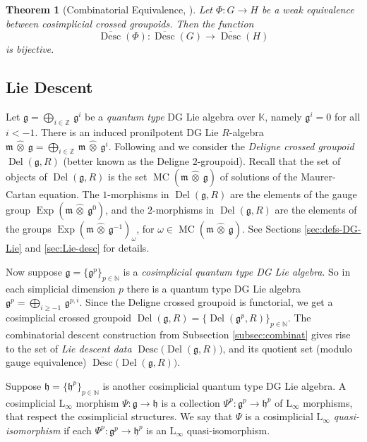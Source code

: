 \documentclass[a4paper, 10pt]{amsart}
\newtheorem{thm}[equation]{Theorem}
\theoremstyle{definition}
\numberwithin{equation}{section}
\newcommand{\opn}{\operatorname}
\newcommand{\ol}{\overline}
\newcommand{\mfrak}[1]{\mathfrak{#1}}
\newcommand{\mrm}[1]{\mathrm{#1}}
\newcommand{\mbb}[1]{\mathbb{#1}}
\newcommand{\hatotimes}[1]{\, \what{{\otimes}}_{#1} \,}
\newcommand{\hot}{\hatotimes{}}
\newcommand{\what}[1]{\widehat{#1}}
\newcommand{\K}{\mbb{K}}
\newcommand{\N}{\mbb{N}}
\newcommand{\Z}{\mbb{Z}}
\newcommand{\g}{\mfrak{g}}
\newcommand{\m}{\mfrak{m}}
\newcommand{\h}{\mfrak{h}}
\newcommand{\om}{\omega}
\newcommand{\lb}{\linebreak}
\begin{document}
\begin{thm}[{Combinatorial Equivalence,  \cite[Theorem 0.1]{Ye8}}]
\label{thm:intro.100}
Let $\Phi : G \to H$ be a weak equivalence between 
cosimplicial crossed groupoids. Then the function 
\[ \ol{\opn{Desc}}(\Phi) : \ol{\opn{Desc}}(G) \to
\ol{\opn{Desc}}(H) \]
is bijective.
\end{thm}


\subsection{Lie Descent}
Let $\g = \bigoplus_{i \in \Z} \, \g^i$ be a {\em quantum type} DG Lie algebra
over $\K$,
namely $\g^i = 0$ for all $i < -1$. There is an induced
pronilpotent DG Lie $R$-algebra 
$\m \hot \g = \bigoplus_{i \in \Z} \, \m \hot \g^i$.
Following \cite{De} and \cite{Ge1} we consider the {\em Deligne crossed
groupoid} $\opn{Del}(\g, R)$ (better known as the Deligne $2$-groupoid). Recall
that the set of objects of 
$\opn{Del}(\g, R)$ is the set $\opn{MC}(\m \hot \g)$ of solutions of the
Maurer-Cartan equation. The $1$-morphisms in $\opn{Del}(\g, R)$ are the
elements of the gauge group $\opn{Exp}(\m \hot \g^0)$, and the 
$2$-morphisms in $\opn{Del}(\g, R)$ are the
elements of the groups $\opn{Exp}(\m \hot \g^{-1})_{\om}$, for 
$\om \in \opn{MC}(\m \hot \g)$. See Sections \ref{sec:defs-DG-Lie} and
\ref{sec:Lie-desc} for details. 

Now suppose $\g = \{ \g^p \}_{p \in \N}$ is a {\em cosimplicial quantum type DG
Lie algebra}. So in each simplicial dimension $p$ there is a quantum type DG Lie
algebra $\g^p = \bigoplus_{i \geq -1} \, \g^{p, i}$.
Since the Deligne crossed groupoid is functorial, we get a cosimplicial
crossed groupoid 
$\opn{Del}(\g, R) = \bigl\{ \opn{Del}(\g^p, R) 
\bigr\}_{p \in \N}$.
The combinatorial descent construction from Subsection \ref{subsec:combinat}
gives rise to the set of {\em Lie descent data} \lb
$\opn{Desc} \bigl( \opn{Del}(\g, R) \bigr)$,
and its quotient set (modulo gauge equivalence)
$\ol{\opn{Desc}} \bigl( \opn{Del}(\g, R) \bigr)$.

Suppose $\h =  \{ \h^p \}_{p \in \N}$ is another cosimplicial quantum type DG
Lie algebra. A cosimplicial
$\mrm{L}_{\infty}$ morphism $\Psi : \g \to \h$ 
is a collection $\Psi^p : \g^p \to \h^p$ of $\mrm{L}_{\infty}$ morphisms,
that respect the cosimplicial structures. We say that $\Psi$ is a cosimplicial
{\em $\mrm{L}_{\infty}$ quasi-isomorphism} if each $\Psi^p : \g^p \to \h^p$
is an $\mrm{L}_{\infty}$ quasi-isomorphism. 
\end{document}
